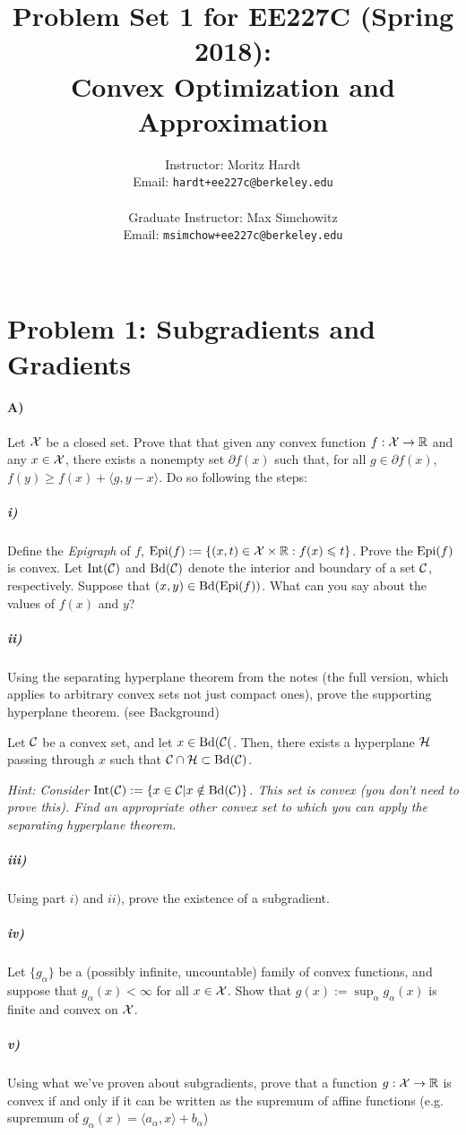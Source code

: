 \documentclass[12pt]{article}
\title{Problem Set 1 for EE227C (Spring 2018):\\
 Convex Optimization and Approximation }
\author{Instructor: Moritz Hardt\\
{\small Email: \tt hardt+ee227c@berkeley.edu}\\ ~\\
Graduate Instructor: Max Simchowitz\\
{\small Email: \tt msimchow+ee227c@berkeley.edu}\\ ~\\
}
\begin{document}
\maketitle




\section*{Problem 1: Subgradients and Gradients}
\paragraph{A)} Let ${\cal X}$ be a closed set. Prove that that given any convex function $f: {\cal X} \to \mathbb{R}$ and any $x \in {\cal X}$, there exists a nonempty set $\partial f(x)$ such that, for all $g \in \partial f(x)$, $f(y) \ge f(x) + \langle g, y - x \rangle$. Do so following the steps:
\subparagraph{i)} Define the \emph{Epigraph} of $f$, $\mathrm{Epi}(f) := \{(x,t) \in {\cal X} \times \mathbb{R}: f(x) \leqslant t\}$. Prove the $\mathrm{Epi}(f)$ is convex. Let $\mathrm{Int}({\cal C})$ and $\mathrm{Bd}({\cal C})$ denote the interior and boundary of a set ${\cal C}$, respectively. Suppose that $(x,y) \in \mathrm{Bd}(\mathrm{Epi}(f))$. What can you say about the values of $f(x)$ and $y$?

\subparagraph{ii)} Using the separating hyperplane theorem from the notes (the full version, which applies to arbitrary convex sets not just compact ones), prove the supporting hyperplane theorem.  (see Background)
\begin{theorem*} Let ${\cal C}$ be a convex set, and let $x \in \mathrm{Bd}({\cal C}($. Then, there exists a hyperplane ${\cal H}$ passing through $x$ such that ${\cal C} \cap {\cal H} \subset \mathrm{Bd}({\cal C}) $. 
\end{theorem*}
\emph{Hint: Consider $\mathrm{Int}({\cal C}) := \{x \in {\cal C} | x \notin \mathrm{Bd}({\cal C})\}$. This set is convex (you don't need to prove this). Find an appropriate other convex set to which you can apply the separating hyperplane theorem.}

\subparagraph{iii)} Using part $i)$ and $ii)$, prove the existence of a subgradient. 

\subparagraph{iv)} Let $\{g_{\alpha}\}$ be a (possibly infinite, uncountable) family of convex functions, and suppose that $g_{\alpha}(x) < \infty$ for all $x \in {\cal X}$. Show that $g(x) := \sup_{\alpha} g_{\alpha}(x)$ is finite and convex on ${\cal X}$. 

\subparagraph{v)} Using what we've proven about subgradients, prove that a function $g: {\cal X} \to \mathbb{R}$ is convex if and only if it can be written as the supremum of affine functions (e.g. supremum of  $g_{\alpha}(x) = \langle a_{\alpha}, x \rangle + b_{\alpha}$)
\end{document}
